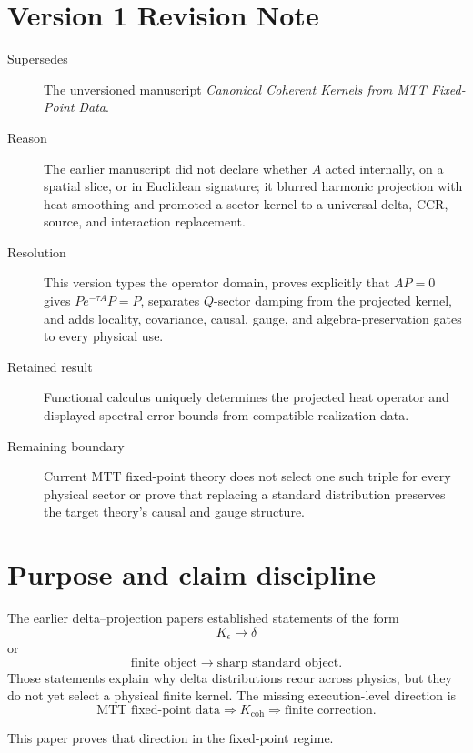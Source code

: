 \documentclass[11pt]{article}
\begin{document}
\section*{Version 1 Revision Note}
\begin{description}
\item[Supersedes] The unversioned manuscript
\emph{Canonical Coherent Kernels from MTT Fixed-Point Data}.
\item[Reason] The earlier manuscript did not declare whether \(A\) acted
internally, on a spatial slice, or in Euclidean signature; it blurred
harmonic projection with heat smoothing and promoted a sector kernel to a
universal delta, CCR, source, and interaction replacement.
\item[Resolution] This version types the operator domain, proves explicitly
that \(AP=0\) gives \(Pe^{-\tau A}P=P\), separates \(Q\)-sector damping from
the projected kernel, and adds locality, covariance, causal, gauge, and
algebra-preservation gates to every physical use.
\item[Retained result] Functional calculus uniquely determines the projected
heat operator and displayed spectral error bounds from compatible realization
data.
\item[Remaining boundary] Current MTT fixed-point theory does not select one
such triple for every physical sector or prove that replacing a standard
distribution preserves the target theory's causal and gauge structure.
\end{description}

\seriestagline

\tableofcontents

\section{Purpose and claim discipline}

The earlier delta--projection papers established statements of the form
\[
        K_\epsilon \longrightarrow \delta
\]
or
\[
        \text{finite object} \longrightarrow \text{sharp standard object}.
\]
Those statements explain why delta distributions recur across physics, but they do not yet
select a physical finite kernel. The missing execution-level direction is
\[
        \text{MTT fixed-point data}
        \Longrightarrow
        K_{\mathrm{coh}}
        \Longrightarrow
        \text{finite correction}.
\]

This paper proves that direction in the fixed-point regime.
\end{document}
